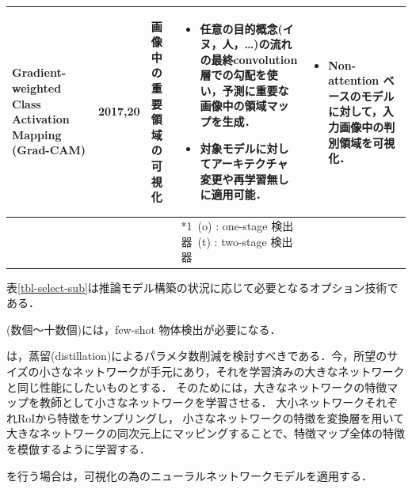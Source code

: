 \documentclass[twocolumn]{jsarticle} %
\begin{document}
\begin{table}
\begin{center}
\begin{tabularx}{\linewidth}{XcXp{7cm}X}
            Gradient-weighted Class Activation Mapping (Grad-CAM) \cite{SCDVPB17,SCDVPB20} & 2017,20 & 画像中の重要領域の可視化 & 
            \begin{itemize}
                \vspace{-0.7\baselineskip}
                \setlength{\leftskip}{-3mm}
                \item 任意の目的概念(イヌ，人，…)の流れの最終convolution層での勾配を使い，予測に重要な画像中の領域マップを生成．
                \item 対象モデルに対してアーキテクチャ変更や再学習無しに適用可能．
            \end{itemize}
            &
            \begin{itemize}
                \vspace{-0.7\baselineskip}
                \setlength{\leftskip}{-3mm}
                \item Non-attention ベースのモデルに対して，入力画像中の判別領域を可視化．
            \end{itemize}
            \\
            \bottomrule
            &  &  & *1\ (o) : one-stage 検出器\quad *2\ (t) : two-stage 検出器 &  \\
        \end{tabularx}
    \end{center}
\end{table}%
表\ref{tbl-select-sub}は推論モデル構築の状況に応じて必要となるオプション技術である．

(数個〜十数個)には，few-shot 物体検出が必要になる\cite{KLWYFD19,FZTT20,WHGDY20}．

は，蒸留(distillation)\cite{LJY17}によるパラメタ数削減を検討すべきである．今，所望のサイズの小さなネットワークが手元にあり，それを学習済みの大きなネットワークと同じ性能にしたいものとする．
そのためには，大きなネットワークの特徴マップを教師として小さなネットワークを学習させる．
大小ネットワークそれぞれRoIから特徴をサンプリングし，
小さなネットワークの特徴を変換層を用いて大きなネットワークの同次元上にマッピングすることで、特徴マップ全体の特徴を模倣するように学習する．

を行う場合は，可視化の為のニューラルネットワークモデル\cite{SCDVPB17,SCDVPB20}を適用する．
\end{document}
